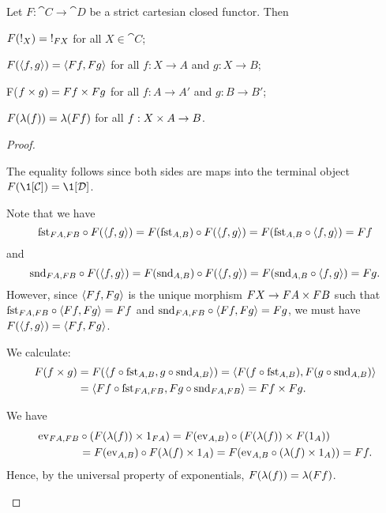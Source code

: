\begin{prop}
Let $F : \cat{C}\to \cat{D}$ be a strict cartesian closed functor. Then
\begin{enum}
    \item $F(\mterm[X]) = \mterm[FX]$ for all $X \in \cat{C}$;
    \item $F(\langle f, g \rangle) = \langle Ff, Fg \rangle$ for all $f : X \to A$ and $g : X \to B$;
    \item F($f \times g) = Ff \times Fg$ for all $f : A \to A'$ and $g : B \to B'$;
    \item $F(\lambda(f)) = \lambda(Ff)$ for all $f : X \times A \to B$.
\end{enum}
\begin{proof}
\begin{enum}
    \item The equality follows since both sides are maps into the terminal object $F(\1[\cat{C}]) = \1[\cat{D}]$.
    
    \item Note that we have
    \[ \mfst[FA,FB] \circ F(\mpair{f}{g}) = F(\mfst[A,B]) \circ F(\mpair{f}{g})
    = F(\mfst[A,B] \circ \mpair{f}{g}) = Ff \]
    and
    \[ \msnd[FA,FB] \circ F(\mpair{f}{g}) = F(\msnd[A,B]) \circ F(\mpair{f}{g})
    = F(\msnd[A,B] \circ \mpair{f}{g}) = Fg. \]
    However, since $\langle Ff, Fg \rangle$ is the unique morphism $FX \to FA \times FB$ such that $\mfst[FA,FB] \circ \mpair{Ff}{Fg} = Ff$ and $\msnd[FA,FB] \circ \mpair{Ff}{Fg} = Fg$, we must have $F(\langle f, g \rangle) = \langle Ff, Fg \rangle$.
    
    \item We calculate:
    \begin{align*}
    F(\cprod{f}{g})
       &= F(\mpair{f \circ \mfst[A,B]}{g \circ \msnd[A,B]})
        = \mpair{F(f \circ \mfst[A,B])}{F(g \circ \msnd[A,B])} \\
       &= \mpair{Ff \circ \mfst[FA,FB]}{Fg \circ \msnd[FA,FB]}
        = \cprod{Ff}{Fg}.
    \end{align*}
    
    \item We have
    \begin{align*}
    \mev[FA,FB] &\circ (\cprod{F(\mcurry{f})}{\id[FA]})
        = F(\mev[A,B]) \circ (\cprod{F(\mcurry{f})}{F(\id[A])}) \\
       &= F(\mev[A,B]) \circ F(\cprod{\mcurry{f}}{\id[A]})
        = F(\mev[A,B] \circ (\cprod{\mcurry{f}}{\id[A]}))
        = Ff.
     \end{align*}
      Hence, by the universal property of exponentials, $F(\lambda(f)) = \lambda(Ff)$. \qedhere
\end{enum}
\end{proof}
\end{prop}

